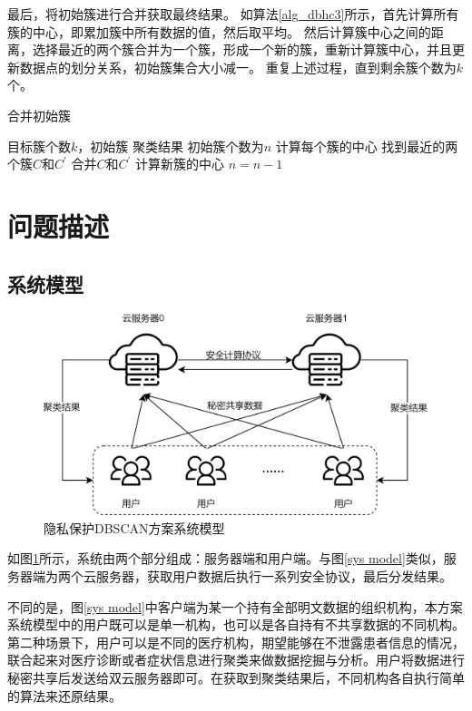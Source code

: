 最后，将初始簇进行合并获取最终结果。
如算法\ref{alg_dbhc3}所示，首先计算所有簇的中心，即累加簇中所有数据的值，然后取平均。
然后计算簇中心之间的距离，选择最近的两个簇合并为一个簇，形成一个新的簇，重新计算簇中心，并且更新数据点的划分关系，初始簇集合大小减一。
重复上述过程，直到剩余簇个数为$ k $个。

\begin{algorithm}[htbp]
	\renewcommand{\algorithmicrequire}{\textbf{输入:}}
	\renewcommand{\algorithmicensure}{\textbf{输出:}}
	\caption{合并初始簇}
	\label{alg_dbhc3}
	\begin{algorithmic}[1]
		\REQUIRE 目标簇个数$ k $，初始簇
		\ENSURE 聚类结果
		\STATE 初始簇个数为$ n $
		\STATE 计算每个簇的中心
		\STATE 找到最近的两个簇$ C $和$ C^{\prime} $
		\STATE 合并$ C $和$ C^{\prime} $
		\STATE 计算新簇的中心
		\STATE $ n = n-1 $
		\ENDWHILE
	\end{algorithmic}
\end{algorithm}
\section{问题描述}
\label{s4-wenti}
\subsection{系统模型}
\begin{figure}[htbp]
	\centering
	\includegraphics[width=0.7\linewidth]{img/sysmodel2.png}%
	\caption{隐私保护DBSCAN方案系统模型}
	\label{s4-sysmod}
\end{figure}
如图\ref{s4-sysmod}所示，系统由两个部分组成：服务器端和用户端。与图\ref{sys model}类似，服务器端为两个云服务器，获取用户数据后执行一系列安全协议，最后分发结果。

不同的是，图\ref{sys model}中客户端为某一个持有全部明文数据的组织机构，本方案系统模型中的用户既可以是单一机构，也可以是各自持有不共享数据的不同机构。第二种场景下，用户可以是不同的医疗机构，期望能够在不泄露患者信息的情况，联合起来对医疗诊断或者症状信息进行聚类来做数据挖掘与分析。用户将数据进行秘密共享后发送给双云服务器即可。在获取到聚类结果后，不同机构各自执行简单的算法来还原结果。
